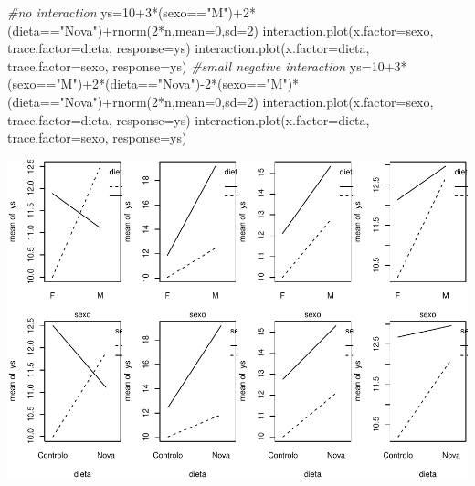 \documentclass[
]{book}
\newenvironment{Shaded}{\begin{snugshade}}{\end{snugshade}}
\newcommand{\AttributeTok}[1]{\textcolor[rgb]{0.77,0.63,0.00}{#1}}
\newcommand{\CommentTok}[1]{\textcolor[rgb]{0.56,0.35,0.01}{\textit{#1}}}
\newcommand{\DecValTok}[1]{\textcolor[rgb]{0.00,0.00,0.81}{#1}}
\newcommand{\FunctionTok}[1]{\textcolor[rgb]{0.00,0.00,0.00}{#1}}
\newcommand{\NormalTok}[1]{#1}
\newcommand{\OtherTok}[1]{\textcolor[rgb]{0.56,0.35,0.01}{#1}}
\newcommand{\SpecialCharTok}[1]{\textcolor[rgb]{0.00,0.00,0.00}{#1}}
\newcommand{\StringTok}[1]{\textcolor[rgb]{0.31,0.60,0.02}{#1}}
\begin{document}
\begin{Shaded}
\begin{Highlighting}[]
\CommentTok{\#no interaction}
\NormalTok{ys}\OtherTok{=}\DecValTok{10}\SpecialCharTok{+}\DecValTok{3}\SpecialCharTok{*}\NormalTok{(sexo}\SpecialCharTok{==}\StringTok{"M"}\NormalTok{)}\SpecialCharTok{+}\DecValTok{2}\SpecialCharTok{*}\NormalTok{(dieta}\SpecialCharTok{==}\StringTok{"Nova"}\NormalTok{)}\SpecialCharTok{+}\FunctionTok{rnorm}\NormalTok{(}\DecValTok{2}\SpecialCharTok{*}\NormalTok{n,}\AttributeTok{mean=}\DecValTok{0}\NormalTok{,}\AttributeTok{sd=}\DecValTok{2}\NormalTok{)}
\FunctionTok{interaction.plot}\NormalTok{(}\AttributeTok{x.factor=}\NormalTok{sexo, }\AttributeTok{trace.factor=}\NormalTok{dieta, }\AttributeTok{response=}\NormalTok{ys)}
\FunctionTok{interaction.plot}\NormalTok{(}\AttributeTok{x.factor=}\NormalTok{dieta, }\AttributeTok{trace.factor=}\NormalTok{sexo, }\AttributeTok{response=}\NormalTok{ys)}
\CommentTok{\#small negative interaction}
\NormalTok{ys}\OtherTok{=}\DecValTok{10}\SpecialCharTok{+}\DecValTok{3}\SpecialCharTok{*}\NormalTok{(sexo}\SpecialCharTok{==}\StringTok{"M"}\NormalTok{)}\SpecialCharTok{+}\DecValTok{2}\SpecialCharTok{*}\NormalTok{(dieta}\SpecialCharTok{==}\StringTok{"Nova"}\NormalTok{)}\SpecialCharTok{{-}}\DecValTok{2}\SpecialCharTok{*}\NormalTok{(sexo}\SpecialCharTok{==}\StringTok{"M"}\NormalTok{)}\SpecialCharTok{*}\NormalTok{(dieta}\SpecialCharTok{==}\StringTok{"Nova"}\NormalTok{)}\SpecialCharTok{+}\FunctionTok{rnorm}\NormalTok{(}\DecValTok{2}\SpecialCharTok{*}\NormalTok{n,}\AttributeTok{mean=}\DecValTok{0}\NormalTok{,}\AttributeTok{sd=}\DecValTok{2}\NormalTok{)}
\FunctionTok{interaction.plot}\NormalTok{(}\AttributeTok{x.factor=}\NormalTok{sexo, }\AttributeTok{trace.factor=}\NormalTok{dieta, }\AttributeTok{response=}\NormalTok{ys)}
\FunctionTok{interaction.plot}\NormalTok{(}\AttributeTok{x.factor=}\NormalTok{dieta, }\AttributeTok{trace.factor=}\NormalTok{sexo, }\AttributeTok{response=}\NormalTok{ys)}
\end{Highlighting}
\end{Shaded}

\includegraphics{ECOMODbook_files/figure-latex/a11.2-1.pdf}
\end{document}
